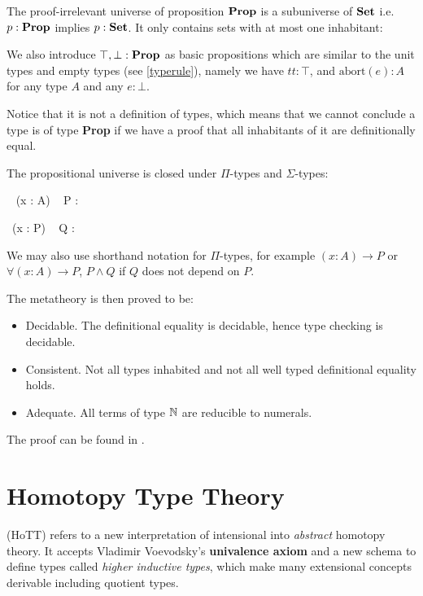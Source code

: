 The proof-irrelevant universe of proposition $\operatorname{\mathbf{Prop}}$ is a subuniverse of  $\operatorname{\mathbf{Set}}$ i.e.\ $p : \operatorname{\mathbf{Prop}}$ implies $p : \operatorname{\mathbf{Set}}$. It only contains sets with at most one inhabitant:


We also introduce $\top, \bot : \operatorname{\mathbf{Prop}}$ as basic propositions which are similar to the unit types and empty types (see \ref{typerule}), namely we have $tt : \top$, and $\text{abort}(e) : A$ for any type $A$ and any $e : \bot$.

 Notice that it is not a definition of types, which means
that we cannot conclude a type is of type \textbf{Prop} if we have a
proof that all inhabitants of it are definitionally equal.

The propositional universe is closed under $\Pi$-types and $\Sigma$-types:

{\Gamma \vdash \Pi~ (x : A) ~ P : \Prop}


{\Gamma \vdash \Sigma ~(x : P) ~ Q : \Prop}

We may also use shorthand notation for $\Pi$-types, for example $(x:A) \to P$ or $\forall (x : A) \to P$, $P \wedge Q$ if $Q$ does not depend on $P$.


The metatheory is then proved to be:

\begin{itemize}
\item Decidable. The definitional equality is decidable, hence type checking is decidable.

\item Consistent. Not all types inhabited and not all well typed definitional equality holds. 

\item Adequate. All terms of type $\mathbb{N}$ are reducible to numerals.
\end{itemize}

The proof can be found in \cite{alti:lics99}.


\section{Homotopy Type Theory}\label{hott}

\hott (HoTT) refers to a new interpretation of intensional \mltt
into \emph{abstract} homotopy theory.
It accepts Vladimir Voevodsky's \textbf{univalence axiom} and a new schema to define types called \emph{higher inductive types}, which make many extensional concepts derivable including quotient types.


